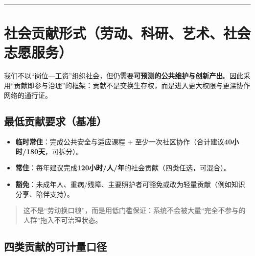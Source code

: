 \begin{center}\rule{0.5\linewidth}{0.5pt}\end{center}

\section{社会贡献形式（劳动、科研、艺术、社会志愿服务）}\label{ux793eux4f1aux8d21ux732eux5f62ux5f0fux52b3ux52a8ux79d1ux7814ux827aux672fux793eux4f1aux5fd7ux613fux670dux52a1}

我们不以``岗位---工资''组织社会，但仍需要\textbf{可预测的公共维护与创新产出}。因此采用``贡献即参与治理''的框架：贡献不是交换生存权，而是进入更大权限与更深协作网络的通行证。

\subsection{最低贡献要求（基准）}\label{ux6700ux4f4eux8d21ux732eux8981ux6c42ux57faux51c6}

\begin{itemize}
\item
  \textbf{临时常住}：完成公共安全与适应课程 + 至少一次社区协作（合计建议\textbf{40小时/180天}，可拆分）。
\item
  \textbf{常住}：每年建议完成\textbf{120小时/人/年}的社会贡献（四类任选，可混合）。
\item
  \textbf{豁免}：未成年人、重病/残障、主要照护者可豁免或改为轻量贡献（例如知识分享、陪伴支持）。
\end{itemize}

\begin{quote}
这不是``劳动换口粮''，而是用低门槛保证：系统不会被大量``完全不参与的人群''拖入不可治理状态。

\end{quote}

\subsection{四类贡献的可计量口径}\label{ux56dbux7c7bux8d21ux732eux7684ux53efux8ba1ux91cfux53e3ux5f84}

